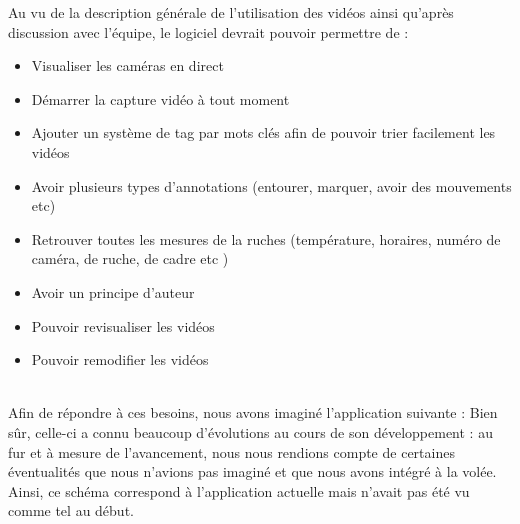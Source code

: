\documentclass[11pt,french,a4paper]{report}
\begin{document}
Au vu de la description générale de l'utilisation des vidéos ainsi qu'après discussion avec l'équipe, le logiciel devrait 
pouvoir permettre de : \\
\begin{itemize}
    \item Visualiser les caméras en direct
    \item Démarrer la capture vidéo à tout moment 
    \item Ajouter un système de tag par mots clés afin de pouvoir trier facilement les vidéos 
    \item Avoir plusieurs types d'annotations (entourer, marquer, avoir des mouvements etc) 
    \item Retrouver toutes les mesures de la ruches (température, horaires, numéro de caméra, de ruche, de cadre etc )  
    \item Avoir un principe d'auteur 
    \item Pouvoir revisualiser les vidéos 
    \item Pouvoir remodifier les vidéos 
\end{itemize} \\
Afin de répondre à ces besoins, nous avons imaginé l'application suivante : 
Bien sûr, celle-ci a connu beaucoup d'évolutions au cours de son développement : au fur et à mesure de l'avancement,
nous nous rendions compte de certaines éventualités que nous n'avions pas imaginé et que nous avons intégré à la volée. 
Ainsi, ce schéma correspond à l'application actuelle mais n'avait pas été vu comme tel au début. 
\\
\end{document}
